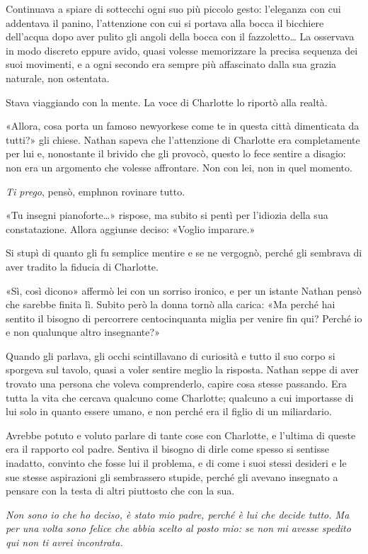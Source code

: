 \documentclass[a4paper,oneside,11pt]{memoir}
\begin{document}
Continuava a spiare di sottecchi ogni suo più piccolo gesto: l'eleganza con cui
addentava il panino, l'attenzione con cui si portava alla bocca il bicchiere
dell'acqua dopo aver pulito gli angoli della bocca con il fazzoletto\dots{} La
osservava in modo discreto eppure avido, quasi volesse memorizzare la precisa
sequenza dei suoi movimenti, e a ogni secondo era sempre più affascinato dalla
sua grazia naturale, non ostentata.

Stava viaggiando con la mente. La voce di Charlotte lo riportò alla realtà.

«Allora, cosa porta un famoso newyorkese come te in questa città dimenticata da
tutti?» gli chiese. Nathan sapeva che l'attenzione di Charlotte era
completamente per lui e, nonostante il brivido che gli provocò, questo lo fece
sentire a disagio: non era un argomento che volesse affrontare. Non con lei, non
in quel momento.

\emph{Ti prego}, pensò, emph{non rovinare tutto}.

«Tu insegni pianoforte\dots{}» rispose, ma subito si pentì per l'idiozia della
sua constatazione. Allora aggiunse deciso: «Voglio imparare.»

Si stupì di quanto gli fu semplice mentire e se ne vergognò, perché gli sembrava
di aver tradito la fiducia di Charlotte.

«Sì, così dicono» affermò lei con un sorriso ironico, e per un istante Nathan
pensò che sarebbe finita lì. Subito però la donna tornò alla carica: «Ma perché
hai sentito il bisogno di percorrere centocinquanta miglia per venire fin qui?
Perché io e non qualunque altro insegnante?»

Quando gli parlava, gli occhi scintillavano di curiosità e tutto il suo corpo si
sporgeva sul tavolo, quasi a voler sentire meglio la risposta. Nathan seppe di
aver trovato una persona che voleva comprenderlo, capire cosa stesse passando.
Era tutta la vita che cercava qualcuno come Charlotte; qualcuno a cui importasse
di lui solo in quanto essere umano, e non perché era il figlio di un
miliardario.

Avrebbe potuto e voluto parlare di tante cose con Charlotte, e l'ultima di
queste era il rapporto col padre. Sentiva il bisogno di dirle come spesso si
sentisse inadatto, convinto che fosse lui il problema, e di come i suoi stessi
desideri e le sue stesse aspirazioni gli sembrassero stupide, perché gli avevano
insegnato a pensare con la testa di altri piuttosto che con la sua.

\emph{Non sono io che ho deciso, è stato mio padre, perché è lui che decide
tutto. Ma per una volta sono felice che abbia scelto al posto mio: se non mi
avesse spedito qui non ti avrei incontrata.}
\end{document}
